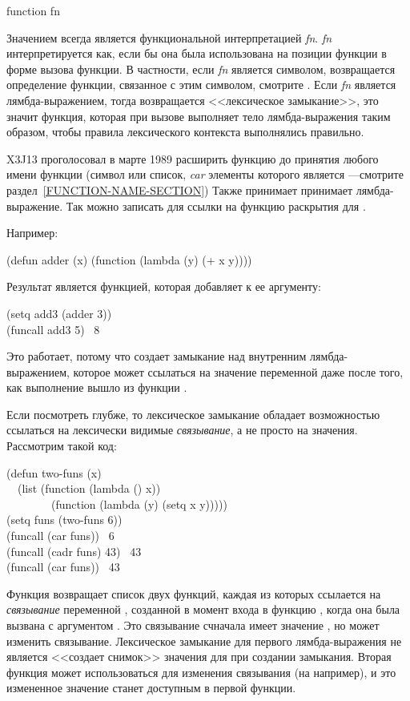 \begin{defspec}
function fn

Значением  всегда является функциональной интерпретацией
\emph{fn}. \emph{fn} интерпретируется как, если бы она была использована на
позиции функции в форме вызова функции.
В частности, если \emph{fn} является символом, возвращается определение функции,
связанное с этим символом, смотрите .
Если \emph{fn} является лямбда-выражением, тогда возвращается <<лексическое
замыкание>>, это значит функция, которая при вызове выполняет тело
лямбда-выражения таким образом, чтобы правила лексического контекста выполнялись 
правильно.

\begin{newer}
X3J13 проголосовал в марте 1989 
расширить функцию 
до принятия любого имени функции (символ или список,
\emph{car} элементы которого является ---смотрите раздел~\ref{FUNCTION-NAME-SECTION})
Также принимает принимает лямбда-выражение.
Так можно записать  для ссылки на функцию раскрытия
 для .
\end{newer}

Например:
\begin{lisp}
(defun adder (x) (function (lambda (y) (+ x y))))
\end{lisp}
Результат  является функцией, которая добавляет  к ее
аргументу:
\begin{lisp}
(setq add3 (adder 3)) \\
(funcall add3 5) \EV\ 8
\end{lisp}
Это работает, потому что  создает замыкание над внутренним
лямбда-выражением, которое может ссылаться на значение  переменной 
даже после того, как выполнение вышло из функции .

Если посмотреть глубже, то лексическое замыкание обладает возможностью ссылаться
на лексически видимые \emph{связывание}, а не просто на значения.
Рассмотрим такой код:
\begin{lisp}
(defun two-funs (x) \\
~~(list (function (lambda () x)) \\
~~~~~~~~(function (lambda (y) (setq x y))))) \\
(setq funs (two-funs 6)) \\
(funcall (car funs)) \EV\ 6 \\
(funcall (cadr funs) 43) \EV\ 43 \\
(funcall (car funs)) \EV\ 43
\end{lisp}
Функция  возвращает список двух функций, каждая из которых
ссылается на \emph{связывание} переменной , созданной в момент входа в
функцию , когда она была вызвана с аргументом .
Это связывание счначала имеет значение , но  может изменить
связывание. Лексическое замыкание для первого лямбда-выражения не является
<<создает снимок>> значения  для  при создании замыкания. Вторая
функция может использоваться для изменения связывания (на  например), и
это измененное значение станет доступным в первой функции.


\end{defspec}
